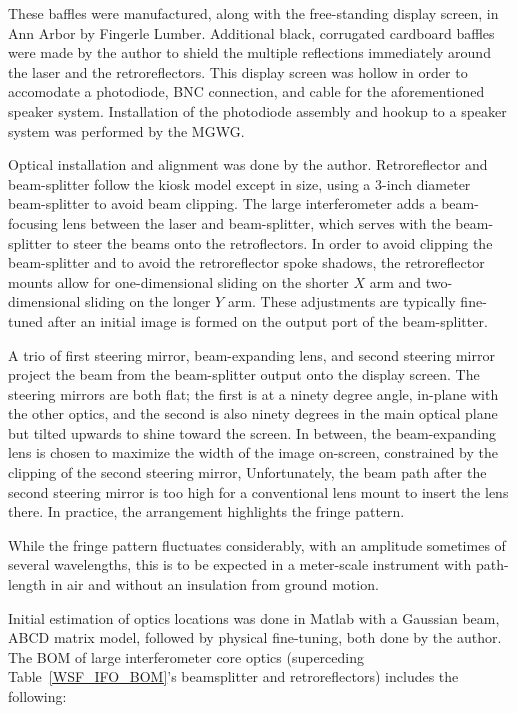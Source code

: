 These baffles were manufactured, along with the free-standing display screen, in Ann Arbor by Fingerle Lumber.
Additional black, corrugated cardboard baffles were made by the author to shield the multiple reflections immediately around the laser and the retroreflectors.
This display screen was hollow in order to accomodate a photodiode, BNC connection, and cable for the aforementioned speaker system.
Installation of the photodiode assembly and hookup to a speaker system was performed by the MGWG.

Optical installation and alignment was done by the author.
Retroreflector and beam-splitter follow the kiosk model except in size, using a 3-inch diameter beam-splitter to avoid beam clipping.
The large interferometer adds a beam-focusing lens between the laser and beam-splitter, which serves with the beam-splitter to steer the beams onto the retroflectors.
In order to avoid clipping the beam-splitter and to avoid the retroreflector spoke shadows, the retroreflector mounts allow for one-dimensional sliding on the shorter $X$ arm and two-dimensional sliding on the longer $Y$ arm.
These adjustments are typically fine-tuned after an initial image is formed on the output port of the beam-splitter.

A trio of first steering mirror, beam-expanding lens, and second steering mirror project the beam from the beam-splitter output onto the display screen.
The steering mirrors are both flat; the first is at a ninety degree angle, in-plane with the other optics, and the second is also ninety degrees in the main optical plane but tilted upwards to shine toward the screen.
In between, the beam-expanding lens is chosen to maximize the width of the image on-screen, constrained by the clipping of the second steering mirror,
Unfortunately, the beam path after the second steering mirror is too high for a conventional lens mount to insert the lens there.
In practice, the arrangement highlights the fringe pattern.

While the fringe pattern fluctuates considerably, with an amplitude sometimes of several wavelengths, this is to be expected in a meter-scale instrument with path-length in air and without an insulation from ground motion.

Initial estimation of optics locations was done in Matlab with a Gaussian beam, ABCD matrix model, followed by physical fine-tuning, both done by the author.
The BOM of large interferometer core optics (superceding Table~\ref{WSF_IFO_BOM}'s beamsplitter and retroreflectors) includes the following:

